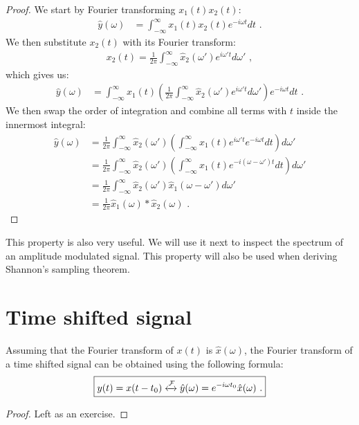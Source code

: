 \begin{proof}
    We start by Fourier transforming $x_1(t)x_2(t)$:
    \begin{align}
        \hat{y}(\omega) & = \int_{-\infty}^{\infty} x_1(t) x_2(t) e^{-i\omega t} dt \,\,.
    \end{align}
    We then substitute $x_2(t)$ with its Fourier transform:
    \begin{align}
        x_2(t) = \frac{1}{2\pi}\int_{-\infty}^{\infty} \hat{x}_2(\omega') e^{i\omega' t}d\omega'\,\,,
    \end{align}
    which gives us:
    \begin{align}
        \hat{y}(\omega) & = \int_{-\infty}^{\infty} x_1(t) \left(\frac{1}{2\pi}\int_{-\infty}^{\infty} \hat{x}_2(\omega') e^{i\omega' t} d\omega' \right) e^{-i\omega t} dt\,\,.
    \end{align}
    We then swap the order of integration and combine all terms with $t$ inside the innermost integral:
    \begin{align}
        \hat{y}(\omega) & = \frac{1}{2\pi} \int_{-\infty}^{\infty} \hat{x}_2(\omega')  \left(\int_{-\infty}^{\infty}  x_1(t) e^{i\omega' t} e^{-i\omega t} dt  \right) d\omega' \\
                        & = \frac{1}{2\pi} \int_{-\infty}^{\infty} \hat{x}_2(\omega')  \left(\int_{-\infty}^{\infty}  x_1(t) e^{-{i(\omega-\omega')t}} dt  \right) d\omega'     \\
                        & = \frac{1}{2\pi} \int_{-\infty}^{\infty} \hat{x}_2(\omega')  \hat{x}_1\left(\omega-\omega'\right) d\omega'                                            \\
                        & = \frac{1}{2\pi}\hat{x}_1(\omega )  *\hat{x}_2(\omega)\,\,.
    \end{align}
\end{proof}
This property is also very useful. We will use it next to inspect the spectrum of an 
amplitude modulated signal. This property will also be used when deriving Shannon's sampling theorem.

\section{Time shifted signal}
Assuming that the Fourier transform of $x(t)$ is $\hat{x}(\omega)$, the Fourier transform 
of a  time shifted signal can be obtained using the following formula:
\begin{equation}
    \boxed{y(t) = x(t-t_0) \xleftrightarrow{\mathcal{F}} \hat{y}(\omega)= e^{-i\omega t_0}\hat{x}(\omega)\,\,.}
    \label{eq:ft:timeshift}
\end{equation}
\begin{proof}
    Left as an exercise.
\end{proof}

